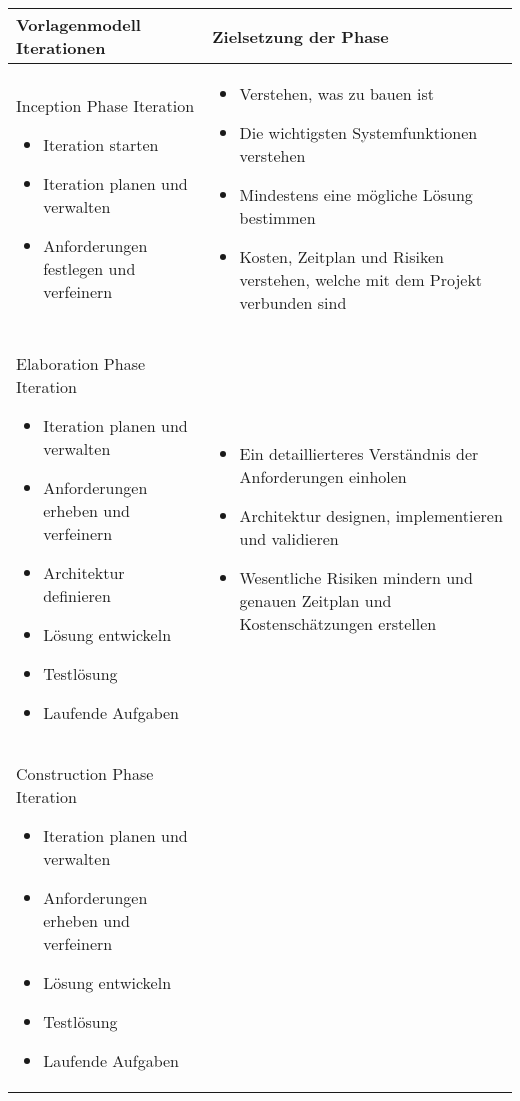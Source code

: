 \begin{longtable}{|p{7cm}|p{8cm}|}
\hline
Vorlagenmodell Iterationen & Zielsetzung der Phase \\
\hline
Inception Phase Iteration 
\begin {itemize}
\item Iteration starten 
 \item  Iteration planen und verwalten
 \item  Anforderungen festlegen und verfeinern 
  \end{itemize}
   &
  
  \begin {itemize}
\item Verstehen, was zu bauen ist
 \item Die wichtigsten Systemfunktionen verstehen 
\item Mindestens eine mögliche Lösung bestimmen
\item Kosten, Zeitplan und Risiken verstehen, welche mit dem Projekt verbunden sind
  \end{itemize}

 \\
\hline
 Elaboration Phase Iteration 
   \begin {itemize}
   \item Iteration planen und verwalten
   \item Anforderungen erheben und verfeinern
   \item Architektur definieren
   \item Lösung entwickeln
   \item Testlösung
   \item Laufende Aufgaben
   
  \end{itemize}

  & 
     \begin {itemize}
   \item Ein detaillierteres Verständnis der Anforderungen einholen
   \item Architektur designen, implementieren und validieren
   \item  Wesentliche Risiken mindern und genauen Zeitplan und Kostenschätzungen erstellen
    \end{itemize}
 \\
\hline
\hline
Construction Phase Iteration 
   \begin {itemize}
   \item Iteration planen und verwalten
   \item Anforderungen erheben und verfeinern
     \item Lösung entwickeln
   \item Testlösung
   \item Laufende Aufgaben


\end{itemize}
\end{longtable}
